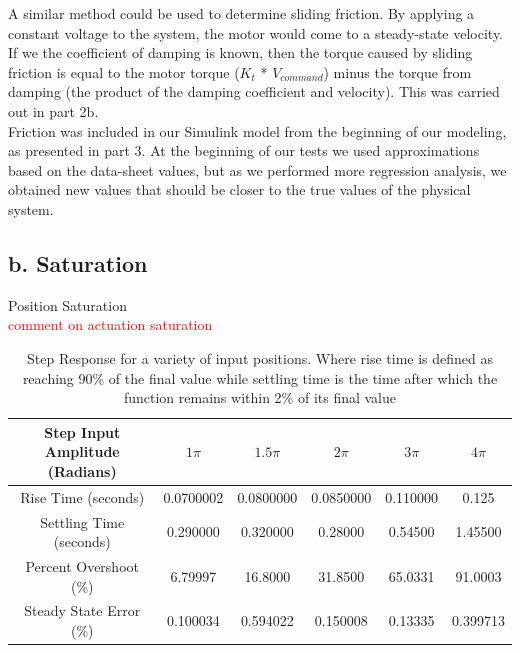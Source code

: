 \documentclass{article}
\newcommand{\xxx}[1]{\textcolor{red}{#1}}
\theoremstyle{plain}
\theoremstyle{definition}
\theoremstyle{remark}
\begin{document}
A similar method could be used to determine sliding friction. By applying a constant voltage to the system, the motor would come to a steady-state velocity. If we the coefficient of damping is known, then the torque caused by sliding friction is equal to the motor torque ($K_{t}$ * $V_{command}$) minus the torque from damping (the product of the damping coefficient and velocity). This was carried out in part 2b.\\

Friction was included in our Simulink model from the beginning of our modeling, as presented in part 3. At the beginning of our tests we used approximations based on the data-sheet values, but as we performed more regression analysis, we obtained new values that should be closer to the true values of the physical system. \\

\subsection*{b. Saturation}

Position Saturation\\

\xxx{comment on actuation saturation}

\begin{table}[htb]
\begin{center}
    \begin{tabular}{|c|c|c|c|c|c|}
        \hline
        Step Input Amplitude (Radians) & $1\pi$   & $1.5 \pi$ & $2\pi$   & $3\pi$   & $4\pi$   \\ \hline
        Rise Time (seconds)            & 0.0700002 & 0.0800000   & 0.0850000 & 0.110000 & 0.125    \\ 
        Settling Time (seconds)        & 0.290000   & 0.320000    & 0.28000   & 0.54500  & 1.45500  \\ 
        Percent Overshoot (\%)          & 6.79997   & 16.8000     & 31.8500   & 65.0331  & 91.0003  \\ 
        Steady State Error (\%)         & 0.100034  & 0.594022    & 0.150008  & 0.13335  & 0.399713 \\
        \hline
    \end{tabular}
\end{center}
\caption{Step Response for a variety of input positions.  Where rise time is defined as reaching 90\% of the final value while settling time is the time after which the function remains within 2\% of its final value}
\label{q5_b6}
\end{table}
\end{document}
